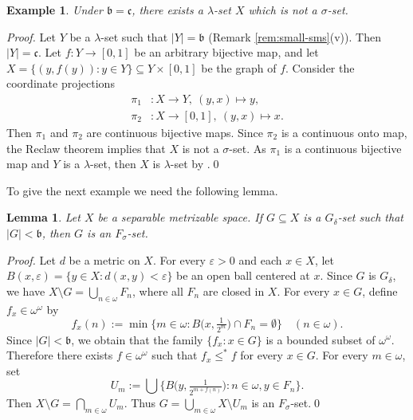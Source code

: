 \documentclass[preprint,11pt]{elsarticle}
\newtheorem{lemma}[theorem]{Lemma}
\newtheorem{example}[theorem]{Example}
\numberwithin{equation}{section}
\numberwithin{theorem}{section}
\newcommand{\e}{\varepsilon}
\newcommand{\w}{\omega}
\begin{document}
\begin{example}\label{exa:gamma-neq-sigma}
Under $\mathfrak{b}=\mathfrak{c}$, there exists a $\lambda$-set $X$ which is not a $\sigma$-set.
\end{example}
\begin{proof}
Let $Y$ be a $\lambda$-set such that $|Y|=\mathfrak{b}$ (Remark \ref{rem:small-sms}(v)). Then $|Y|=\mathfrak{c}$. Let $f\colon Y\to [0,1]$ be an arbitrary  bijective map, and let $X=\{(y,f(y)): y\in Y\}\subseteq Y\times[0,1]$ be the graph of $f$. Consider the coordinate projections
\begin{align*}
\pi_1&\colon X \to Y,\ (y,x) \mapsto y,
\\
\pi_2&\colon X \to [0,1],\ (y,x) \mapsto x.
\end{align*}
Then $\pi_1$ and $\pi_2$ are continuous bijective maps. Since $\pi_2$ is a continuous onto map, the Reclaw theorem \cite[Theorem 3.5]{Miller2017} implies that $X$ is not a $\sigma$-set. As $\pi_1$ is a continuous bijective map and $Y$ is a $\lambda$-set, then $X$ is $\lambda$-set by \cite[Lemma 9.3.1]{Miller}.\qed
\end{proof}

To give the next example we need the following lemma.

\begin{lemma}\label{l:p-Gdelta}
Let $X$ be a separable metrizable space. If $G\subseteq X$ is a $G_\delta$-set such that $|G|<\mathfrak{b}$, then $G$ is an $F_\sigma$-set.
\end{lemma}

\begin{proof}
Let $d$ be a metric on $X$. For every $\e>0$ and each $x\in X$, let  $B(x,\e)=\{y\in X: d(x,y)<\e\}$ be an open ball centered at $x$. Since $G$ is $G_\delta$, we have $X\setminus G=\bigcup_{n\in\w}F_n$, where all $F_n$ are closed in $X$. For every $x\in G$, define $f_x\in\w^\w$ by
\[
f_x(n):=\min \big\{m\in\w: B\big(x,\tfrac{1}{2^m}\big)\cap F_n=\emptyset\} \quad (n\in\w).
\]
Since $|G|<\mathfrak{b}$, we obtain that the family $\{f_x:x\in G\}$ is a bounded subset of $\w^\w$. Therefore there exists $f\in\w^\w$ such that $f_x\leq^\ast f$ for every $x\in G$. For every $m\in\w$, set
\[
U_m :=\bigcup\Big\{B\big(y,\tfrac{1}{2^{m+f(n)}}\big): n\in\w, y\in F_n \Big\}.
\]
Then $X\setminus G=\bigcap_{m\in\w} U_m$. Thus $G=\bigcup_{m\in\w} X\setminus U_m$ is an $F_\sigma$-set.\qed
\end{proof}
\end{document}
